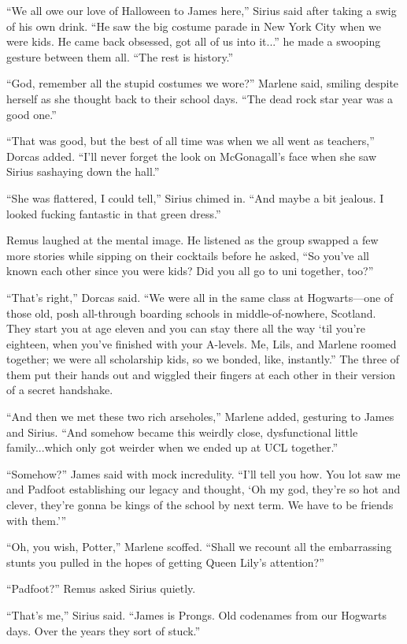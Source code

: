 “We all owe our love of Halloween to James here,” Sirius said after taking a swig of his own drink. “He saw the big costume parade in New York City when we were kids. He came back obsessed, got all of us into it...” he made a swooping gesture between them all. “The rest is history.”

“God, remember all the stupid costumes we wore?” Marlene said, smiling despite herself as she thought back to their school days. “The dead rock star year was a good one.”

“That was good, but the best of all time was when we all went as teachers,” Dorcas added. “I’ll never forget the look on McGonagall’s face when she saw Sirius sashaying down the hall.”

“She was flattered, I could tell,” Sirius chimed in. “And maybe a bit jealous. I looked fucking fantastic in that green dress.”

Remus laughed at the mental image. He listened as the group swapped a few more stories while sipping on their cocktails before he asked, “So you’ve all known each other since you were kids? Did you all go to uni together, too?”

“That’s right,” Dorcas said. “We were all in the same class at Hogwarts—one of those old, posh all-through boarding schools in middle-of-nowhere, Scotland. They start you at age eleven and you can stay there all the way ‘til you’re eighteen, when you’ve finished with your A-levels. Me, Lils, and Marlene roomed together; we were all scholarship kids, so we bonded, like, instantly.” The three of them put their hands out and wiggled their fingers at each other in their version of a secret handshake.

“And then we met these two rich arseholes,” Marlene added, gesturing to James and Sirius. “And somehow became this weirdly close, dysfunctional little family...which only got weirder when we ended up at UCL together.”

“Somehow?” James said with mock incredulity. “I’ll tell you how. You lot saw me and Padfoot establishing our legacy and thought, ‘Oh my god, they’re so hot and clever, they’re gonna be kings of the school by next term. We have to be friends with them.’”

“Oh, you wish, Potter,” Marlene scoffed. “Shall we recount all the embarrassing stunts you pulled in the hopes of getting Queen Lily’s attention?”

“Padfoot?” Remus asked Sirius quietly.

“That’s me,” Sirius said. “James is Prongs. Old codenames from our Hogwarts days. Over the years they sort of stuck.”

